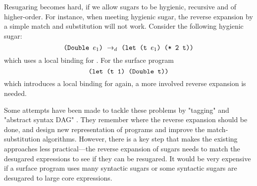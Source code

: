 Resugaring becomes hard, if we allow sugars to be hygienic, recursive and of higher-order.
For instance, when meeting hygienic sugar, the reverse expansion by a simple match and substitution will not work. Consider the following hygienic sugar:
\[
\texttt{(Double $e_1$)} ~\rightarrow_d~ \texttt{(let (t $e_1$) (* 2 t))}
\]
which uses a local binding for . For the surface program
\[
\texttt{(let (t 1) (Double t))}
\]
which introduces a local binding for  again, a more involved reverse expansion is needed.

Some attempts have been made to tackle these problems by "tagging" \cite{resugaring} and "abstract syntax DAG" \cite{hygienic}.
They remember where the reverse expansion should be done, and design new representation of programs and improve the match-substitution algorithms.
However, there is a key step that makes the existing approaches less practical---the reverse expansion of sugars needs to match the desugared expressions to see if they can be resugared. It would be very expensive if a surface program uses many syntactic sugars or some syntactic sugars are desugared to large core expressions.



